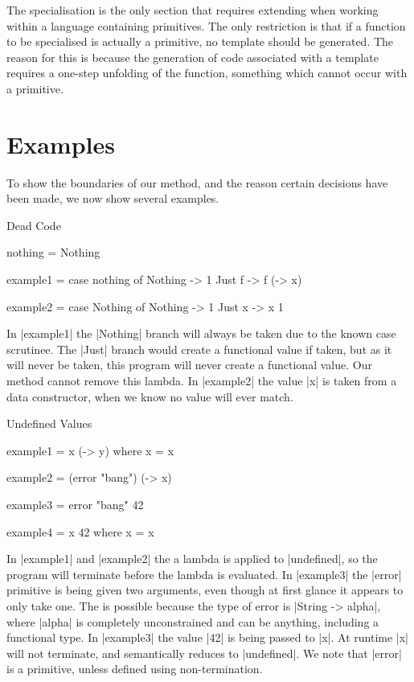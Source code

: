 \documentclass[preprint]{sigplanconf}
\begin{document}
The specialisation is the only section that requires extending when working within a language containing primitives. The only restriction is that if a function to be specialised is actually a primitive, no template should be generated. The reason for this is because the generation of code associated with a template requires a one-step unfolding of the function, something which cannot occur with a primitive.

\section{Examples}

To show the boundaries of our method, and the reason certain decisions have been made, we now show several examples.

\begin{examplename}{Dead Code}
\begin{code}
nothing = Nothing

example1 = case  nothing of
                Nothing  -> 1
                Just f   -> f (\x -> x)

example2 = case  Nothing of
                 Nothing  ->  1
                 Just x   ->  x 1
\end{code}

In |example1| the |Nothing| branch will always be taken due to the known case scrutinee. The |Just| branch would create a functional value if taken, but as it will never be taken, this program will never create a functional value. Our method cannot remove this lambda. In |example2| the value |x| is taken from a data constructor, when we know no value will ever match.
\end{examplename}

\begin{examplename}{Undefined Values}
\begin{code}
example1 = x (\y -> y)
    where x = x

example2 = (error "bang") (\x -> x)

example3 = error "bang" 42

example4 = x 42
    where x = x
\end{code}

In |example1| and |example2| the a lambda is applied to |undefined|, so the program will terminate before the lambda is evaluated. In |example3| the |error| primitive is being given two arguments, even though at first glance it appears to only take one. The is possible because the type of error is |String -> alpha|, where |alpha| is completely unconstrained and can be anything, including a functional type. In |example3| the value |42| is being passed to |x|. At runtime |x| will not terminate, and semantically reduces to |undefined|. We note that |error| is a primitive, unless defined using non-termination.
\end{examplename}
\end{document}
